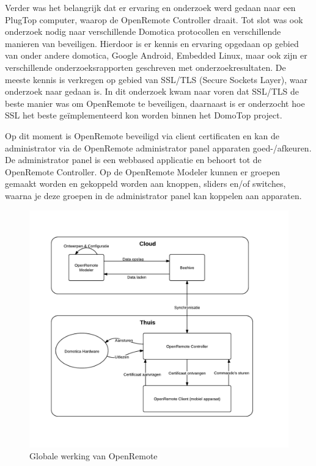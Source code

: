 \documentclass[]{article}
\begin{document}
Verder was het belangrijk dat er ervaring en onderzoek werd gedaan naar een PlugTop computer, waarop de OpenRemote Controller
draait. Tot slot was ook onderzoek nodig naar verschillende Domotica
protocollen en verschillende manieren van beveiligen. Hierdoor is er kennis en
ervaring opgedaan op gebied van onder andere domotica, Google Android, Embedded
Linux, maar ook zijn er verschillende onderzoeksrapporten geschreven met
onderzoekresultaten. De meeste kennis is verkregen op gebied van SSL/TLS (Secure Sockets Layer),
waar onderzoek naar gedaan is. In dit onderzoek kwam naar voren dat SSL/TLS
de beste manier was om OpenRemote te beveiligen, daarnaast is er onderzocht hoe
SSL het beste ge\"implementeerd kon worden binnen het DomoTop project. 

Op dit moment is OpenRemote beveiligd via client certificaten en kan de
administrator via de OpenRemote administrator panel apparaten goed-/afkeuren. De
administrator panel is een webbased applicatie en behoort tot de OpenRemote
Controller. Op de OpenRemote Modeler kunnen er groepen gemaakt worden en
gekoppeld worden aan knoppen, sliders en/of switches, waarna je deze groepen in
de administrator panel kan koppelen aan apparaten.

\begin{figure}[htpb]
   \begin{center}
     \includegraphics[width=\textwidth]{GlobalOR.pdf}
   \end{center}
   \caption{Globale werking van OpenRemote}
   \label{global}
\end{figure}
\end{document}
